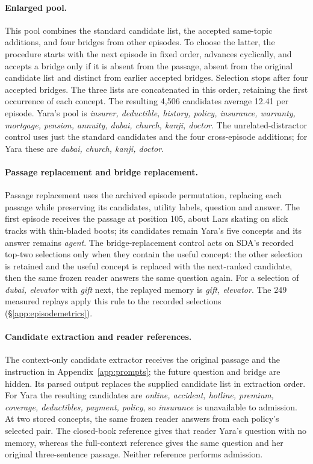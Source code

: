 \paragraph{Enlarged pool.}
This pool combines the standard candidate list, the accepted same-topic
additions, and four bridges from other episodes. To choose the latter,
the procedure starts with the next episode in fixed order, advances
cyclically, and accepts a bridge only if it is absent from the passage,
absent from the original candidate list and distinct from earlier
accepted bridges. Selection stops after four accepted bridges. The three
lists are concatenated in this order, retaining the first occurrence of
each concept. The resulting 4,506 candidates average 12.41 per episode.
Yara's pool is \emph{insurer, deductible, history, policy, insurance,
warranty, mortgage, pension, annuity, dubai, church, kanji, doctor}.
The unrelated-distractor control uses just the standard candidates and
the four cross-episode additions; for Yara these are \emph{dubai,
church, kanji, doctor}.

\paragraph{Passage replacement and bridge replacement.}
Passage replacement uses the archived episode permutation, replacing
each passage while preserving its candidates, utility labels, question
and answer. The first episode receives the passage at position 105,
about Lars skating on slick tracks with thin-bladed boots; its candidates
remain Yara's five concepts and its answer remains \emph{agent}.
The bridge-replacement control acts on SDA's recorded top-two selections
only when they contain the useful concept: the other selection is
retained and the useful concept is replaced with the next-ranked
candidate, then the same frozen reader answers the same question again.
For a selection of \emph{dubai, elevator} with \emph{gift} next, the
replayed memory is \emph{gift, elevator}. The 249 measured replays apply
this rule to the recorded selections (\S\ref{app:episodemetrics}).

\paragraph{Candidate extraction and reader references.}
The context-only candidate extractor receives the original passage and
the instruction in Appendix~\ref{app:prompts}; the future question and
bridge are hidden. Its parsed output replaces the supplied candidate
list in extraction order. For Yara the resulting candidates are
\emph{online, accident, hotline, premium, coverage, deductibles, payment,
policy}, so \emph{insurance} is unavailable to admission. At two stored
concepts, the same frozen reader answers from each policy's selected
pair. The closed-book reference gives that reader Yara's question with
no memory, whereas the full-context reference gives the same question
and her original three-sentence passage. Neither reference performs
admission.

